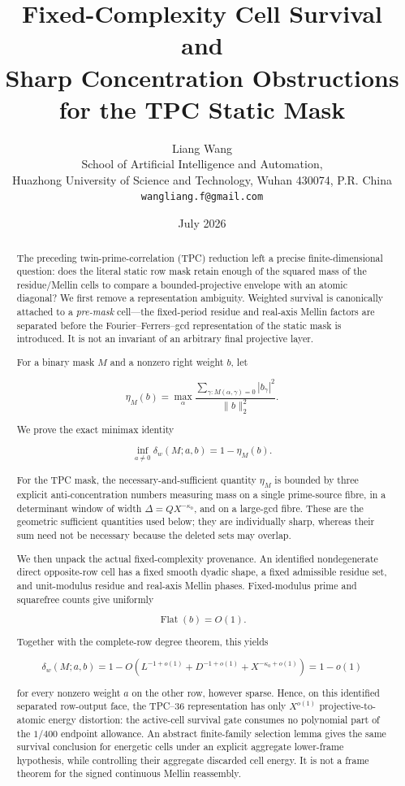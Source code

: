 \documentclass[11pt]{article}
\title{\bfseries Fixed-Complexity Cell Survival and\\
Sharp Concentration Obstructions\\
for the TPC Static Mask}
\author{Liang Wang\\
\small School of Artificial Intelligence and Automation,\\[-2pt]
\small Huazhong University of Science and Technology, Wuhan 430074, P.R. China\\
\small \texttt{wangliang.f@gmail.com}}
\date{July 2026}
\theoremstyle{definition}
\theoremstyle{remark}
\begin{document}
\maketitle

\begin{abstract}
The preceding twin-prime-correlation (TPC) reduction left a precise
finite-dimensional question: does the literal static row mask retain
enough of the squared mass of the residue/Mellin cells to compare a
bounded-projective envelope with an atomic diagonal?  We first remove a
representation ambiguity.  Weighted survival is canonically attached
to a \emph{pre-mask} cell---the fixed-period residue and real-axis
Mellin factors are separated before the Fourier--Ferrers--gcd
representation of the static mask is introduced.  It is not an
invariant of an arbitrary final projective layer.

For a binary mask \(M\) and a nonzero right weight \(b\), let

\[
 \eta_M(b)=\max_\alpha
 \frac{\sum_{\gamma:M(\alpha,\gamma)=0}|b_\gamma|^2}
      {\|b\|_2^2}.
\]

We prove the exact minimax identity

\[
 \inf_{a\ne0}\delta_w(M;a,b)=1-\eta_M(b).
\]

For the TPC mask, the necessary-and-sufficient quantity \(\eta_M\) is
bounded by three explicit
anti-concentration numbers measuring mass on a single prime-source
fibre, in a determinant window of width
\(\Delta=QX^{-\kappa_0}\), and on a large-gcd fibre.  These are the
geometric sufficient quantities used below; they are individually
sharp, whereas their sum need not be necessary because the deleted
sets may overlap.

We then unpack the actual fixed-complexity provenance.  An identified
nondegenerate direct opposite-row cell has a fixed smooth dyadic shape,
a fixed admissible residue set, and unit-modulus residue and real-axis
Mellin phases.
Fixed-modulus prime and squarefree counts give uniformly

\[
 \operatorname{Flat}(b)=O(1).
\]

Together with the complete-row degree theorem, this yields

\[
 \delta_w(M;a,b)
 =1-O\!\left(L^{-1+o(1)}+D^{-1+o(1)}
                 +X^{-\kappa_0+o(1)}\right)
 =1-o(1)
\]

for every nonzero weight \(a\) on the other row, however sparse.
Hence, on this identified separated row-output face, the TPC--36 representation
has only \(X^{o(1)}\) projective-to-atomic energy distortion: the
active-cell survival gate consumes no polynomial part of the
\(1/400\) endpoint allowance.  An abstract finite-family selection
lemma gives the same survival conclusion for energetic cells under an
explicit aggregate lower-frame hypothesis, while controlling their
aggregate discarded cell energy.  It is not a frame theorem for the
signed continuous Mellin reassembly.


\end{abstract}
\end{document}
